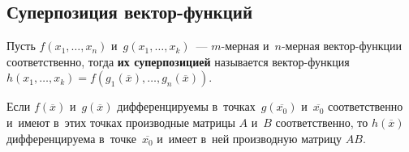 \subsection{Суперпозиция вектор-функций}
Пусть $f(x_1, \ldots, x_n)$ и~$g(x_1, \ldots, x_k)$~--- $m$\nobreakdash-мерная и~$n$\nobreakdash-мерная вектор-функции соответственно, тогда \textbf{их суперпозицией} называется вектор-функция~$h(x_1, \ldots, x_k) = f(g_1(\overline x), \ldots, g_n(\overline x))$.

\begin{theorem}
Если $f(\overline x)$ и~$g(\overline x)$ дифференцируемы в~точках~$g(\overline{x_0})$ и~$\overline{x_0}$ соответственно и~имеют в~этих точках производные матрицы $A$ и~$B$ соответственно, то $h(\overline x)$ дифференцируема в~точке~$\overline{x_0}$ и~имеет в~ней производную матрицу $AB$.
\end{theorem}